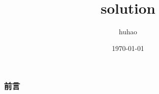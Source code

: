 \documentclass[10pt]{beamer}
\begin{document}
	\title{solution}
	\date{\today}
	\author{huhao}
	\maketitle
	\clearpage
	\begin{frame}
		\frametitle{前言}
	\end{frame}
\end{document}
